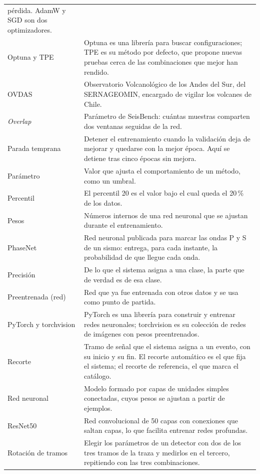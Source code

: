 {\begin{longtable}{>{\raggedright\arraybackslash}p{3.4cm}>{\raggedright\arraybackslash}p{9.4cm}}
pérdida. AdamW y SGD son dos optimizadores. \\
Optuna y TPE & Optuna es una librería para buscar configuraciones; TPE es su
método por defecto, que propone nuevas pruebas cerca de las combinaciones que
mejor han rendido. \\
OVDAS & Observatorio Volcanológico de los Andes del Sur, del SERNAGEOMIN,
encargado de vigilar los volcanes de Chile. \\
\emph{Overlap} & Parámetro de SeisBench: cuántas muestras comparten dos
ventanas seguidas de la red. \\
Parada temprana & Detener el entrenamiento cuando la validación deja de mejorar
y quedarse con la mejor época. Aquí se detiene tras cinco épocas sin
mejora. \\
Parámetro & Valor que ajusta el comportamiento de un método, como un
umbral. \\
Percentil & El percentil 20 es el valor bajo el cual queda el 20\,\% de los
datos. \\
Pesos & Números internos de una red neuronal que se ajustan durante el
entrenamiento. \\
PhaseNet & Red neuronal publicada para marcar las ondas P y S de un sismo:
entrega, para cada instante, la probabilidad de que llegue cada onda. \\
Precisión & De lo que el sistema asigna a una clase, la parte que de verdad es
de esa clase. \\
Preentrenada (red) & Red que ya fue entrenada con otros datos y se usa como
punto de partida. \\
PyTorch y torchvision & PyTorch es una librería para construir y entrenar
redes neuronales; torchvision es su colección de redes de imágenes con pesos
preentrenados. \\
Recorte & Tramo de señal que el sistema asigna a un evento, con su inicio y su
fin. El recorte automático es el que fija el sistema; el recorte de referencia,
el que marca el catálogo. \\
Red neuronal & Modelo formado por capas de unidades simples conectadas, cuyos
pesos se ajustan a partir de ejemplos. \\
ResNet50 & Red convolucional de 50 capas con conexiones que saltan capas, lo
que facilita entrenar redes profundas. \\
Rotación de tramos & Elegir los parámetros de un detector con dos de los tres
tramos de la traza y medirlos en el tercero, repitiendo con las tres
combinaciones. \\

\end{longtable}}
